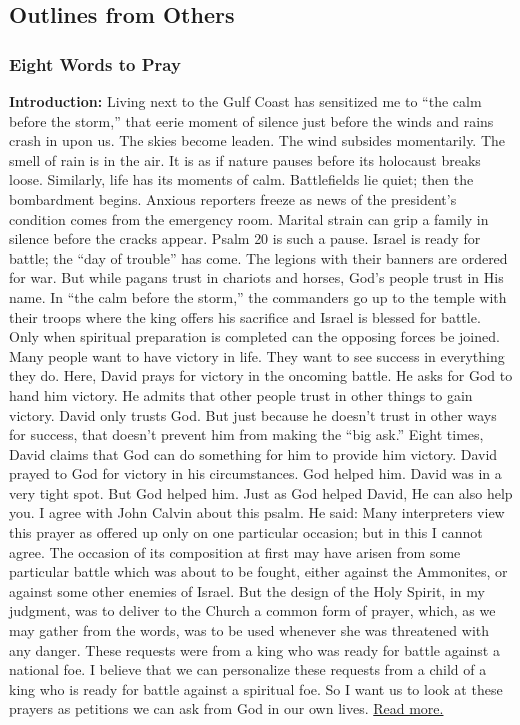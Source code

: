 \subsection{Outlines from Others}

\subsubsection{Eight Words to Pray}
\textbf{Introduction: }Living next to the Gulf Coast has sensitized me to “the calm before the storm,” that eerie moment of silence just before the winds and rains crash in upon us. The skies become leaden. The wind subsides momentarily. The smell of rain is in the air. It is as if nature pauses before its holocaust breaks loose. Similarly, life has its moments of calm. Battlefields lie quiet; then the bombardment begins. Anxious reporters freeze as news of the president’s condition comes from the emergency room. Marital strain can grip a family in silence before the cracks appear. Psalm 20 is such a pause. Israel is ready for battle; the “day of trouble” has come. The legions with their banners are ordered for war. But while pagans trust in chariots and horses, God’s people trust in His name. In “the calm before the storm,” the commanders go up to the temple with their troops where the king offers his sacrifice and Israel is blessed for battle. Only when spiritual preparation is completed can the opposing forces be joined. Many people want to have victory in life. They want to see success in everything they do. Here, David prays for victory in the oncoming battle. He asks for God to hand him victory. He admits that other people trust in other things to gain victory. David only trusts God. But just because he doesn’t trust in other ways for success, that doesn’t prevent him from making the “big ask.” Eight times, David claims that God can do something for him to provide him victory. David prayed to God for victory in his circumstances. God helped him. David was in a very tight spot. But God helped him. Just as God helped David, He can also help you. I agree with John Calvin about this psalm. He said: Many interpreters view this prayer as offered up only on one particular occasion; but in this I cannot agree. The occasion of its composition at first may have arisen from some particular battle which was about to be fought, either against the Ammonites, or against some other enemies of Israel. But the design of the Holy Spirit, in my judgment, was to deliver to the Church a common form of prayer, which, as we may gather from the words, was to be used whenever she was threatened with any danger. These requests were from a king who was ready for battle against a national foe. I believe that we can personalize these requests from a child of a king who is ready for battle against a spiritual foe. So I want us to look at these prayers as petitions we can ask from God in our own lives. \href{http://www.patheos.com/blogs/jimerwin/2016/04/18/psalm-201-9-trusting-god-prayer/\#Mgi8KGIip8tAbGeA.99}{Read more.}
